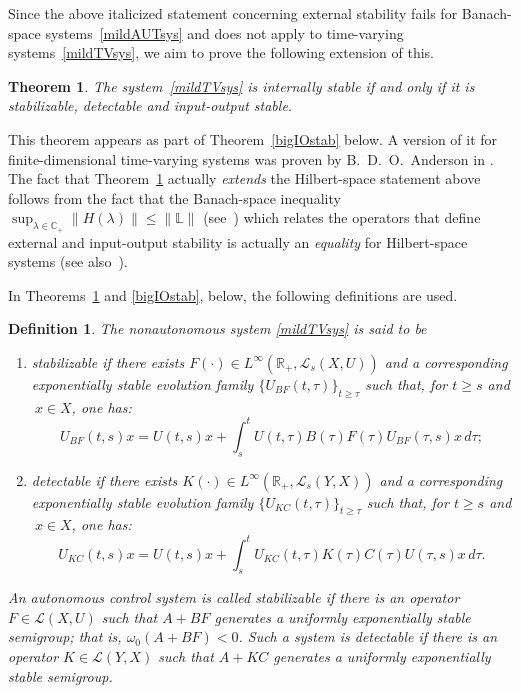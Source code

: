 \documentclass[10pt,psamsfonts,leqno]{siamltex}
\newtheorem{thm}[prop]{Theorem}
\newtheorem{defn}[prop]{Definition}
\newcommand{\bbC}{\mathbb{C}}
\newcommand{\bbR}{\mathbb{R}}
\newcommand{\bbL}{\mathbb{L}}
\renewcommand{\t}{\tau}
\newcommand{\lb}{\label}
\begin{document}
Since the above italicized statement concerning external
stability fails for Banach-space systems~\eqref{mildAUTsys} and does not
apply to time-varying systems~\eqref{mildTVsys}, we aim to prove the
following extension of this.

\begin{thm}\label{IOstab} The system~\eqref{mildTVsys} is internally
stable if and only if it is stabilizable, detectable and input-output
stable.
\end{thm}

\noindent This theorem appears as part of Theorem~\ref{bigIOstab} below.
A version of it for finite-dimensional time-varying systems was
proven by B.~D.~O.~Anderson in \cite{And2}.
The fact that Theorem~\ref{IOstab} actually {\em extends} the
Hilbert-space statement above follows from the fact that the
 Banach-space inequality
$\sup_{\lambda\in \bbC_+}\|H(\lambda)\|\le \|\bbL\|$
(see~\cite{Weiss2}) which relates the operators that define external
and input-output stability is actually an {\em equality} for
Hilbert-space systems (see also~\cite{Weiss1}).

 In Theorems~\ref{IOstab} and \ref{bigIOstab}, below, the following
definitions are used.

\begin{defn}\label{StabDetDefn}
The nonautonomous system \eqref{mildTVsys}  is said to be
\begin{enumerate}
\item[(a)]  {\em stabilizable} if there
exists $F(\cdot)\in L^\infty(\bbR_+,\mathcal{L}_s(X,U))$ and a
corresponding exponentially stable evolution family
$\{U_{BF}(t,\tau)\}_{t\ge \tau}$ such that, for $t\ge s$ and $\ x\in
X$, one has:
\begin{equation}\lb{UBF}
U_{BF}(t,s)x=U(t,s)x+ \int_s^t
U(t,\t)B(\t)F(\t)U_{BF}(\t,s)x\,d\tau;
\end{equation}
\item[(b)] {\em detectable} if there
exists $K(\cdot)\in L^\infty(\bbR_+,\mathcal{L}_s(Y,X))$ and a
corresponding exponentially stable evolution family
$\{U_{KC}(t,\tau)\}_{t\ge \tau}$ such that, for $t\ge s$ and $\ x\in X$,
one has:
\begin{equation}\lb{UKC}
U_{KC}(t,s)x=U(t,s)x+ \int_s^t
U_{KC}(t,\t)K(\t)C(\t)U(\t,s)x\,d\tau .
\end{equation}
\end{enumerate}
An autonomous control system is called {\em stabilizable} if there is
an operator $F\in\mathcal{L}(X,U)$ such that $A+BF$ generates a
uniformly exponentially stable semigroup; that is, $\omega_0(A+BF)<0$.
Such a system is {\em detectable} if there is
an operator $K\in\mathcal{L}(Y,X)$ such that $A+KC$ generates a
uniformly exponentially stable semigroup.
\end{defn}
\end{document}
